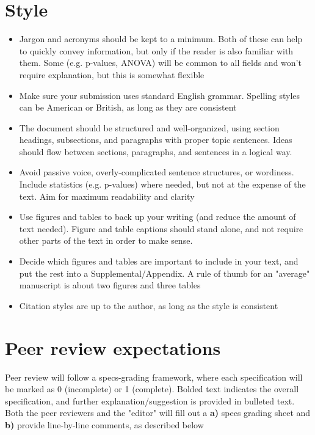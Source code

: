 \documentclass[11pt]{article}
\begin{document}
\section*{Style}

\begin{itemize}
  \item Jargon and acronyms should be kept to a minimum. Both of these can help to quickly convey information, but only if the reader is also familiar with them. Some (e.g. p-values, ANOVA) will be common to all fields and won't require explanation, but this is somewhat flexible
  \item Make sure your submission uses standard English grammar. Spelling styles can be American or British, as long as they are consistent
  \item The document should be structured and well-organized, using section headings, subsections, and paragraphs with proper topic sentences. Ideas should flow between sections, paragraphs, and sentences in a logical way.
  \item Avoid passive voice, overly-complicated sentence structures, or wordiness. Include statistics (e.g. p-values) where needed, but not at the expense of the text. Aim for maximum readability and clarity
  \item Use figures and tables to back up your writing (and reduce the amount of text needed). Figure and table captions should stand alone, and not require other parts of the text in order to make sense.
  \item Decide which figures and tables are important to include in your text, and put the rest into a Supplemental/Appendix. A rule of thumb for an "average" manuscript is about two figures and three tables 
  \item Citation styles are up to the author, as long as the style is consistent
  
\end{itemize}

\newpage

\section*{Peer review expectations}

Peer review will follow a specs-grading framework, where each specification will be marked as 0 (incomplete) or 1 (complete). Bolded text indicates the overall specification, and further explanation/suggestion is provided in bulleted text. Both the peer reviewers and the "editor" will fill out a \textbf{a)} specs grading sheet and \textbf{b)} provide line-by-line comments, as described below
\end{document}
